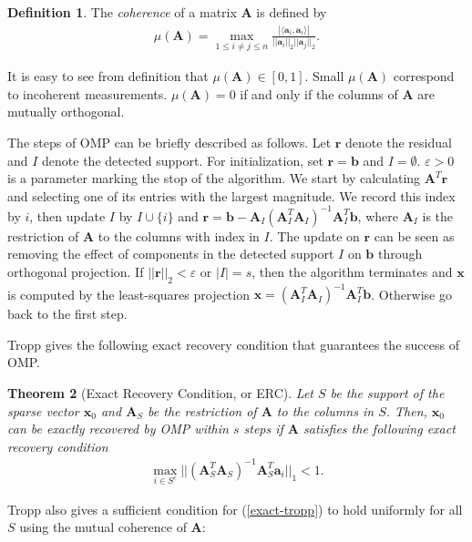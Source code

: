 \documentclass[11pt]{article}
\numberwithin{equation}{section}
\theoremstyle{plain}
\newtheorem{Th}{Theorem}[section]
\theoremstyle{definition}
\newtheorem{Def}[Th]{Definition}
\def\A{{\mathbf A}}
\def\x{{\mathbf x}}
\def\b{{\mathbf b}}
\def\a{{\mathbf a}}
\def\e{{\varepsilon}}
\begin{document}
\begin{Def}
The \emph{coherence} of a matrix $\A$ is defined by
\begin{align*}
\mu(\A)=\max_{1\leq i\neq j\leq n}\frac{|\langle\a_i, \a_i\rangle|}{||\a_i||_2||\a_j||_2}. 
\end{align*} 
\end{Def}

It is easy to see from definition that $\mu(\A)\in [0, 1]$. Small $\mu(\A)$ correspond to incoherent measurements. $\mu(\A)=0$ if and only if the columns of $\A$ are mutually orthogonal.

The steps of OMP can be briefly described as follows. Let $\mathbf{r}$ denote the residual and $I$ denote the detected support. For initialization, set $\mathbf{r}=\b$ and $I=\emptyset$. $\e>0$ is a parameter marking the stop of the algorithm. We start by calculating $\A^T\mathbf{r}$ and selecting one of its entries with the largest magnitude. We record this index by $i$, then update $I$ by $I\cup\{i\}$ and $\mathbf{r}=\b-\A_I(\A_I^T \A_I)^{-1}\A_I^T \b$, where $\A_I$ is the restriction of $\A$ to the columns with index in $I$. The update on $\mathbf{r}$ can be seen as removing the effect of components in the detected support $I$ on $\b$ through orthogonal projection. If $||\mathbf{r}||_2<\e$ or $|I|=s$, then the algorithm terminates and $\x$ is computed by the least-squares projection $\x=(\A_I^T \A_I)^{-1}\A_I^T \b$. Otherwise go back to the first step. 

Tropp gives the following exact recovery condition that guarantees the success of OMP. 

\begin{Th}[Exact Recovery Condition, or ERC]
Let $S$ be the support of the sparse vector $\x_0$ and $\A_S$ be the restriction of $\A$ to the columns in $S$. Then, $\x_0$ can be exactly recovered by OMP within $s$ steps if $\A$ satisfies the following exact recovery condition
\begin{align}
\max_{i\in S^c}||(\A^T_S\A_S)^{-1}\A^T_S\a_i||_1<1.\label{exact-tropp}
\end{align} 
\end{Th}

Tropp also gives a sufficient condition for (\ref{exact-tropp}) to hold uniformly for all $S$ using the mutual coherence of $\A$:
\end{document}
